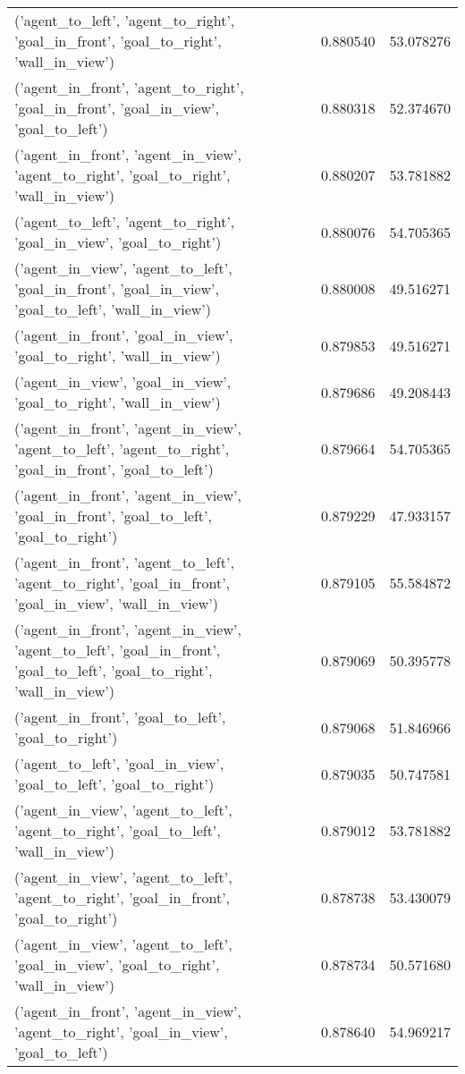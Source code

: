 \begin{tabular}{lrr}
('agent\_to\_left', 'agent\_to\_right', 'goal\_in\_front', 'goal\_to\_right', 'wall\_in\_view') & 0.880540 & 53.078276 \\
('agent\_in\_front', 'agent\_to\_right', 'goal\_in\_front', 'goal\_in\_view', 'goal\_to\_left') & 0.880318 & 52.374670 \\
('agent\_in\_front', 'agent\_in\_view', 'agent\_to\_right', 'goal\_to\_right', 'wall\_in\_view') & 0.880207 & 53.781882 \\
('agent\_to\_left', 'agent\_to\_right', 'goal\_in\_view', 'goal\_to\_right') & 0.880076 & 54.705365 \\
('agent\_in\_view', 'agent\_to\_left', 'goal\_in\_front', 'goal\_in\_view', 'goal\_to\_left', 'wall\_in\_view') & 0.880008 & 49.516271 \\
('agent\_in\_front', 'goal\_in\_view', 'goal\_to\_right', 'wall\_in\_view') & 0.879853 & 49.516271 \\
('agent\_in\_view', 'goal\_in\_view', 'goal\_to\_right', 'wall\_in\_view') & 0.879686 & 49.208443 \\
('agent\_in\_front', 'agent\_in\_view', 'agent\_to\_left', 'agent\_to\_right', 'goal\_in\_front', 'goal\_to\_left') & 0.879664 & 54.705365 \\
('agent\_in\_front', 'agent\_in\_view', 'goal\_in\_front', 'goal\_to\_left', 'goal\_to\_right') & 0.879229 & 47.933157 \\
('agent\_in\_front', 'agent\_to\_left', 'agent\_to\_right', 'goal\_in\_front', 'goal\_in\_view', 'wall\_in\_view') & 0.879105 & 55.584872 \\
('agent\_in\_front', 'agent\_in\_view', 'agent\_to\_left', 'goal\_in\_front', 'goal\_to\_left', 'goal\_to\_right', 'wall\_in\_view') & 0.879069 & 50.395778 \\
('agent\_in\_front', 'goal\_to\_left', 'goal\_to\_right') & 0.879068 & 51.846966 \\
('agent\_to\_left', 'goal\_in\_view', 'goal\_to\_left', 'goal\_to\_right') & 0.879035 & 50.747581 \\
('agent\_in\_view', 'agent\_to\_left', 'agent\_to\_right', 'goal\_to\_left', 'wall\_in\_view') & 0.879012 & 53.781882 \\
('agent\_in\_view', 'agent\_to\_left', 'agent\_to\_right', 'goal\_in\_front', 'goal\_to\_right') & 0.878738 & 53.430079 \\
('agent\_in\_view', 'agent\_to\_left', 'goal\_in\_view', 'goal\_to\_right', 'wall\_in\_view') & 0.878734 & 50.571680 \\
('agent\_in\_front', 'agent\_in\_view', 'agent\_to\_right', 'goal\_in\_view', 'goal\_to\_left') & 0.878640 & 54.969217 \\

\end{tabular}
